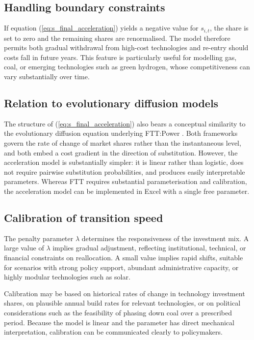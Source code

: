 \documentclass[preprint,authoryear,12pt]{elsarticle}
\begin{document}
\subsection{Handling boundary constraints}

If equation (\ref{eq:s_final_acceleration}) yields a negative value for $s_{i,t}$, the share is set to
zero and the remaining shares are renormalised. The model therefore permits both gradual
withdrawal from high-cost technologies and re-entry should costs fall in future years. This
feature is particularly useful for modelling gas, coal, or emerging technologies such as green
hydrogen, whose competitiveness can vary substantially over time.

\subsection{Relation to evolutionary diffusion models}

The structure of (\ref{eq:s_final_acceleration}) also bears a conceptual similarity to the
evolutionary diffusion equation underlying FTT:Power \cite{Mercure2012}. Both frameworks
govern the rate of change of market shares rather than the instantaneous level, and both embed a
cost gradient in the direction of substitution. However, the acceleration model is 
substantially simpler: it is linear rather than logistic, does not require pairwise substitution
probabilities, and produces easily interpretable parameters. Whereas FTT requires substantial
parameterisation and calibration, the acceleration model can be implemented in Excel with a
single free parameter.

\subsection{Calibration of transition speed}

The penalty parameter $\lambda$ determines the responsiveness of the investment mix. A large
value of $\lambda$ implies gradual adjustment, reflecting institutional, technical, or financial
constraints on reallocation. A small value implies rapid shifts, suitable for scenarios with strong
policy support, abundant administrative capacity, or highly modular technologies such as solar.

Calibration may be based on historical rates of change in technology investment shares,
on plausible annual build rates for relevant technologies, or on political considerations such as
the feasibility of phasing down coal over a prescribed period. Because the model is linear and the
parameter has direct mechanical interpretation, calibration can be communicated clearly to
policymakers.
\end{document}
